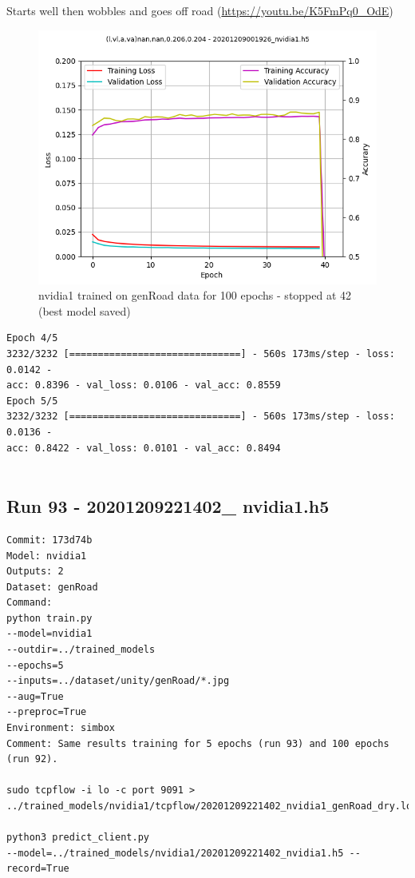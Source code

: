 Starts well then wobbles and goes off road (\url{https://youtu.be/K5FmPq0_OdE})
\begin{figure}[ht]
 \centering 
 \includegraphics[width=\textwidth]{Figures/20201209001926_nvidia1_accuracy.png}
 \caption{nvidia1 trained on genRoad data for 100 epochs - stopped at 42 (best model saved)}
 \label{fig:20201209001926_nvidia1_accuracy} 
\end{figure}


\begin{verbatim}
Epoch 4/5
3232/3232 [==============================] - 560s 173ms/step - loss: 0.0142 - 
acc: 0.8396 - val_loss: 0.0106 - val_acc: 0.8559
Epoch 5/5
3232/3232 [==============================] - 560s 173ms/step - loss: 0.0136 - 
acc: 0.8422 - val_loss: 0.0101 - val_acc: 0.8494
    
\end{verbatim}

\subsection{Run 93 - 20201209221402\_ nvidia1.h5 }
\label{app_res:93}
\begin{verbatim}
Commit: 173d74b
Model: nvidia1
Outputs: 2
Dataset: genRoad
Command:
python train.py
--model=nvidia1
--outdir=../trained_models
--epochs=5
--inputs=../dataset/unity/genRoad/*.jpg
--aug=True
--preproc=True
Environment: simbox
Comment: Same results training for 5 epochs (run 93) and 100 epochs (run 92).

sudo tcpflow -i lo -c port 9091 >
../trained_models/nvidia1/tcpflow/20201209221402_nvidia1_genRoad_dry.log

python3 predict_client.py 
--model=../trained_models/nvidia1/20201209221402_nvidia1.h5 --record=True
\end{verbatim}

